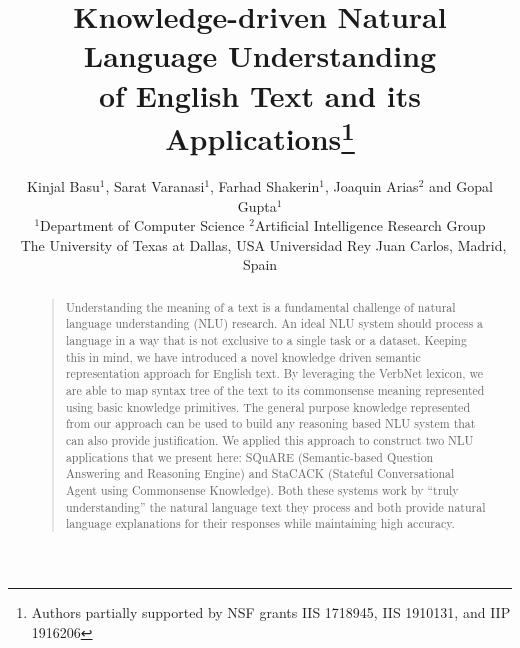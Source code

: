 \documentclass[letterpaper]{article}
\begin{document}
 
 
 
%
\title{Knowledge-driven Natural Language Understanding\\of English Text and its Applications\thanks{Authors partially supported by NSF grants IIS 1718945, IIS 1910131, and IIP 1916206}}

\author {
  Kinjal Basu$^1$, Sarat  Varanasi$^1$, Farhad Shakerin$^1$, Joaquin Arias$^2$ and Gopal Gupta$^1$\\[.5em]
  {  \large $^1$Department of Computer Science \hfill $^2$Artificial Intelligence Research Group}\\{\large ~\hspace{.3em}The University of Texas at Dallas, USA\hspace{.7em} \hfill Universidad Rey Juan Carlos, Madrid, Spain}
}


         
\maketitle
\begin{abstract}
\begin{quote}
Understanding the meaning of a text is a fundamental challenge of natural language understanding (NLU) research. An ideal NLU system should process a language in a way that is not exclusive to a single task or a dataset. Keeping this in mind, we have introduced a novel knowledge driven semantic representation approach for English text. By leveraging the VerbNet lexicon, we are able to map syntax tree of the text to its commonsense meaning represented using basic knowledge primitives. The general purpose knowledge represented from our approach can be used to build any reasoning based NLU system that can also provide justification. We applied this approach to construct two NLU applications that we present here: SQuARE (Semantic-based Question Answering and Reasoning Engine) and StaCACK (Stateful Conversational Agent using Commonsense Knowledge). 
Both these systems work by ``truly understanding'' the natural language text they process and both provide natural language explanations for their responses while maintaining high accuracy. 

\end{quote}
\end{abstract}
\end{document}
